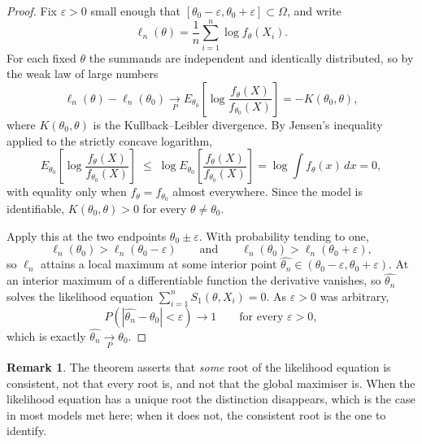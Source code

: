 \documentclass[12pt,a4paper]{report}
\theoremstyle{definition}
\newtheorem*{remark}{Remark}
\begin{document}
\begin{proof}
Fix $\varepsilon>0$ small enough that $[\theta_0-\varepsilon,\theta_0+\varepsilon]\subset\Omega$, and write
\[\ell_n(\theta) = \frac{1}{n}\sum_{i=1}^{n}\log f_{\theta}(X_i).\]
For each fixed $\theta$ the summands are independent and identically
distributed, so by the weak law of large numbers
\[\ell_n(\theta) - \ell_n(\theta_0) \underset{P}{\longrightarrow}
E_{\theta_0}\left[\log \frac{f_{\theta}(X)}{f_{\theta_0}(X)}\right] = -K(\theta_0,\theta),\]
where $K(\theta_0,\theta)$ is the Kullback--Leibler divergence. By Jensen's
inequality applied to the strictly concave logarithm,
\[E_{\theta_0}\left[\log \frac{f_{\theta}(X)}{f_{\theta_0}(X)}\right]
\;\leq\; \log E_{\theta_0}\left[\frac{f_{\theta}(X)}{f_{\theta_0}(X)}\right]
= \log \int f_{\theta}(x)\,dx = 0,\]
with equality only when $f_{\theta} = f_{\theta_0}$ almost everywhere. Since the
model is identifiable, $K(\theta_0,\theta) > 0$ for every $\theta \neq \theta_0$.

Apply this at the two endpoints $\theta_0 \pm \varepsilon$. With probability
tending to one,
\[\ell_n(\theta_0) > \ell_n(\theta_0-\varepsilon)
\qquad\text{and}\qquad
\ell_n(\theta_0) > \ell_n(\theta_0+\varepsilon),\]
so $\ell_n$ attains a local maximum at some interior point
$\widehat{\theta_n}\in(\theta_0-\varepsilon,\theta_0+\varepsilon)$. At an
interior maximum of a differentiable function the derivative vanishes, so
$\widehat{\theta_n}$ solves the likelihood equation
$\sum_{i=1}^{n}S_1(\theta,X_i)=0$. As $\varepsilon>0$ was arbitrary,
\[P\left(\left|\widehat{\theta_n}-\theta_0\right|<\varepsilon\right)\longrightarrow 1
\qquad\text{for every } \varepsilon>0,\]
which is exactly $\widehat{\theta_n}\underset{P}{\longrightarrow}\theta_0$.
\end{proof}

\begin{remark}
The theorem asserts that \emph{some} root of the likelihood equation is
consistent, not that every root is, and not that the global maximiser is. When
the likelihood equation has a unique root the distinction disappears, which is
the case in most models met here; when it does not, the consistent root is the
one to identify.
\end{remark}
\end{document}
